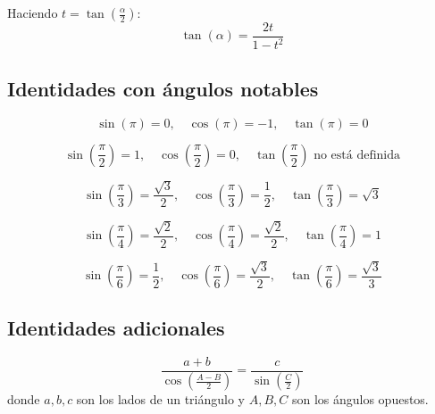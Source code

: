 \begin{proposición}
Haciendo $t = \tan\left(\frac{\alpha}{2}\right)$:
$$\tan(\alpha) = \frac{2t}{1 - t^2}$$
\end{proposición}

\subsection{Identidades con ángulos notables}

\begin{proposición}[Valores para $\alpha = \pi$]
$$\sin(\pi) = 0, \quad \cos(\pi) = -1, \quad \tan(\pi) = 0$$
\end{proposición}

\begin{proposición}[Valores para $\alpha = \frac{\pi}{2}$]
$$\sin\left(\frac{\pi}{2}\right) = 1, \quad \cos\left(\frac{\pi}{2}\right) = 0, \quad \tan\left(\frac{\pi}{2}\right) \text{ no está definida}$$
\end{proposición}

\begin{proposición}[Valores para $\alpha = \frac{\pi}{3}$]
$$\sin\left(\frac{\pi}{3}\right) = \frac{\sqrt{3}}{2}, \quad \cos\left(\frac{\pi}{3}\right) = \frac{1}{2}, \quad \tan\left(\frac{\pi}{3}\right) = \sqrt{3}$$
\end{proposición}

\begin{proposición}[Valores para $\alpha = \frac{\pi}{4}$]
$$\sin\left(\frac{\pi}{4}\right) = \frac{\sqrt{2}}{2}, \quad \cos\left(\frac{\pi}{4}\right) = \frac{\sqrt{2}}{2}, \quad \tan\left(\frac{\pi}{4}\right) = 1$$
\end{proposición}

\begin{proposición}[Valores para $\alpha = \frac{\pi}{6}$]
$$\sin\left(\frac{\pi}{6}\right) = \frac{1}{2}, \quad \cos\left(\frac{\pi}{6}\right) = \frac{\sqrt{3}}{2}, \quad \tan\left(\frac{\pi}{6}\right) = \frac{\sqrt{3}}{3}$$
\end{proposición}

\subsection{Identidades adicionales}

\begin{proposición}
$$\frac{a + b}{\cos\left(\frac{A - B}{2}\right)} = \frac{c}{\sin\left(\frac{C}{2}\right)}$$
donde $a, b, c$ son los lados de un triángulo y $A, B, C$ son los ángulos opuestos.
\end{proposición}

